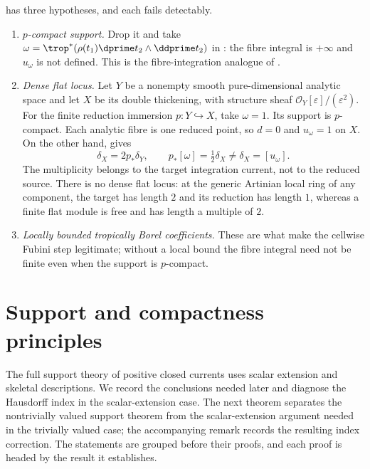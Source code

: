 \begin{remark}
\label{rem:ch14-fibre-hypotheses}
 has three hypotheses, and each fails
detectably.
\begin{enumerate}
\item \emph{$p$-compact support.}  Drop it and take
  $\omega=\trop^*(\rho(t_1)\dprime t_2\wedge\ddprime t_2)$ in
  : the fibre integral is
  $+\infty$ and $u_\omega$ is not defined.  This is the fibre-integration
  analogue of .
\item \emph{Dense flat locus.}  Let $Y$ be a nonempty smooth pure-dimensional
  analytic space and let $X$ be its double thickening, with structure
  sheaf $\mathcal O_Y[\varepsilon]/(\varepsilon^2)$.
  For the finite reduction immersion $p:Y\hookrightarrow X$, take
  $\omega=1$.  Its support is $p$-compact.  Each analytic fibre is one
  reduced point, so $d=0$ and $u_\omega=1$ on $X$.  On the other hand,
   gives
  \[
       \delta_X=2p_*\delta_Y,\qquad
       p_*[\omega]=\tfrac12\delta_X
                  \ne\delta_X=[u_\omega].
  \]
  The multiplicity belongs to the target integration current, not to
  the reduced source.  There is no dense flat locus: at the generic
  Artinian local ring of any component, the target has length $2$ and
  its reduction has length $1$, whereas a finite flat module is free
  and has length a multiple of $2$.
\item \emph{Locally bounded tropically Borel coefficients.}  These are what
  make the cellwise Fubini step legitimate; without a local bound the fibre
  integral need not be finite even when the support is $p$-compact.
\end{enumerate}
\end{remark}

\section{Support and compactness principles}
\label{sec:ch14-compactness}

The full support theory of positive closed currents uses scalar extension and
skeletal descriptions.  We record the conclusions needed later and diagnose
the Hausdorff index in the scalar-extension case.  The next theorem separates
the nontrivially valued support theorem from the scalar-extension argument
needed in the trivially valued case; the accompanying remark records the
resulting index correction.  The statements are grouped before their proofs,
and each proof is headed by the result it establishes.

